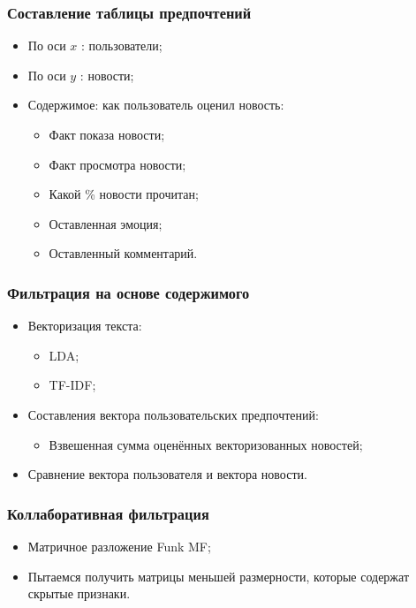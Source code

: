 \documentclass[xetex,mathserif,serif]{beamer}
\begin{document}
\begin{frame}
	\frametitle{Составление таблицы предпочтений}

	\begin{itemize}
		\item По оси $x$ : пользователи;
		\item По оси $y$ : новости;
		\item Содержимое: как пользователь оценил новость:
            \begin{itemize}
                \item Факт показа новости;
                \item Факт просмотра новости;
                \item Какой \% новости прочитан;
                \item Оставленная эмоция;
                \item Оставленный комментарий.
            \end{itemize}
	\end{itemize}
\end{frame}


\begin{frame}
    \frametitle{Фильтрация на основе содержимого}

	\begin{itemize}
		\item Векторизация текста:
            \begin{itemize}
                \item LDA;
                \item TF-IDF;
            \end{itemize}
		\item Составления вектора пользовательских предпочтений:
            \begin{itemize}
                \item Взвешенная сумма оценённых векторизованных новостей;
            \end{itemize}
		\item Сравнение вектора пользователя и вектора новости.
	\end{itemize}
\end{frame}

\begin{frame}
    \frametitle{Коллаборативная фильтрация}

	\begin{itemize}
		\item Матричное разложение Funk MF;
		\item Пытаемся получить матрицы меньшей размерности, которые содержат скрытые признаки.
	\end{itemize}
\end{frame}
\end{document}
